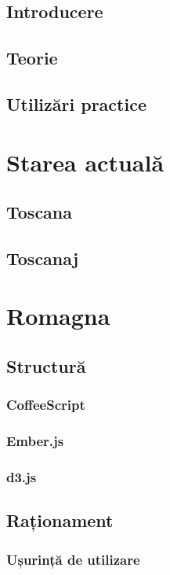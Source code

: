 \documentclass[12pt, a4paper, twoside, romanian]{teza-upb}
\begin{document}
  \section{Introducere}
  \section{Teorie}
  \section{Utilizări practice}

\chapter{Starea actuală}
  \section{Toscana}
  \section{Toscanaj}

\chapter{Romagna}
  \section{Structură}
    \subsection{CoffeeScript}
    \subsection{Ember.js}
    \subsection{d3.js}

  \section{Raționament}

    \subsection{Ușurință de utilizare}
\end{document}
